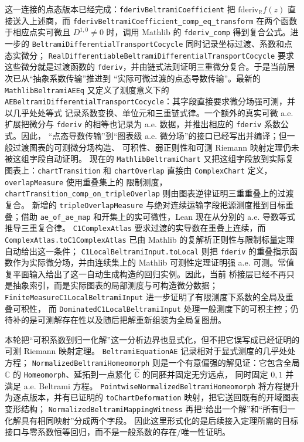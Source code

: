 \documentclass[UTF8,fontset=none,a4paper,11pt]{ctexart}
\begin{document}
这一连接的点态版本已经完成：\texttt{fderivBeltramiCoefficient} 把
\(\mathrm{fderiv}_{\mathbb R}f(z)\) 直接送入上述商，而
\texttt{fderivBeltramiCoefficient\_comp\_eq\_transform} 在两个函数于相应点实可微且
\(D^{1,0}\ne0\) 时，调用 Mathlib 的 \texttt{fderiv\_comp} 得到复合公式。进一步的
\texttt{BeltramiDifferentialTransportCocycle} 同时记录坐标过渡、系数和点态实微分；
\texttt{RealDifferentiableBeltramiDifferentialTransportCocycle} 要求这些微分就是过渡函数的
\texttt{fderiv}，并由链式法则证明三重微分复合。于是当前层次已从“抽象系数传输”推进到
“实际可微过渡的点态导数传输”。最新的 \texttt{MathlibBeltramiAEEq} 又定义了测度意义下的
\texttt{AEBeltramiDifferentialTransportCocycle}：其字段直接要求微分场强可测，并以几乎处处等式
记录系数变换、单位元和三重链式律。一个额外的真实可微 a.e. 扩展把微分与
\texttt{fderiv} 的相等也记录为 a.e. 数据，并推出相应的 \texttt{fderiv} 系数公式。因此，
“点态导数传输”到“图表级 a.e. 微分场”的接口已经写出并编译；但一般过渡图表的可测微分场构造、
可积性、弱正则性和可测 Riemann 映射定理仍未被这组字段自动证明。
现在的 \texttt{MathlibBeltramiChart} 又把这组字段放到实际复图表上：\texttt{chartTransition} 和
\texttt{chartOverlap} 直接由 \texttt{ComplexChart} 定义，\texttt{overlapMeasure} 使用重叠集上的
限制测度，\texttt{chartTransition\_comp\_on\_tripleOverlap} 则由图表逆律证明三重重叠上的过渡复合。
新增的 \texttt{tripleOverlapMeasure} 与绝对连续运输字段把源测度推到目标重叠；借助
\texttt{ae\_of\_ae\_map} 和开集上的实可微性，Lean 现在从分别的 a.e. 导数等式推导三重复合律。
\texttt{C1ComplexAtlas} 要求过渡的实导数在重叠上连续，而
\texttt{ComplexAtlas.toC1ComplexAtlas} 已由 Mathlib 的复解析正则性与限制标量定理自动给出这一条件；
\texttt{C1LocalBeltramiInput.toLocal} 则把 \texttt{fderiv} 的重叠指示函数作为实际微分场，并由连续集上的
Mathlib 可测性定理证明强 a.e. 可测。常值复平面输入给出了这一自动生成构造的回归实例。因此，当前
桥接层已经不再只是抽象索引，而是实际图表的局部测度与可构造微分数据；
\texttt{FiniteMeasureC1LocalBeltramiInput} 进一步证明了有限测度下系数的全局及重叠可积性，
而 \texttt{DominatedC1LocalBeltramiInput} 处理一般测度下的可积主控；仍待补的是可测解存在性以及随后把解重新组装为全局复图册。

本轮把“可积系数到归一化解”这一分析边界也显式化，但不把它误写成已经证明的可测 Riemann 映射定理。
\texttt{BeltramiEquationAE} 记录相对于显式测度的几乎处处方程；
\texttt{NormalizedBeltramiHomeomorph} 则是一个有意偏强的解见证：它包含全局
\(\mathbb C\) 的 \texttt{Homeomorph}、延拓到一点紧化 \(\widehat{\mathbb C}\) 的同胚并固定无穷远点，
同时固定 \(0,1\) 并满足 a.e. Beltrami 方程。
\texttt{PointwiseNormalizedBeltramiHomeomorph} 将方程提升为逐点版本，并有已证明的
\texttt{toChartDeformation} 映射，把它送回既有的开域图表变形结构；
\texttt{NormalizedBeltramiMappingWitness} 再把“给出一个解”和“所有归一化解具有相同映射”分成两个字段。
因此这里形式化的是后续接入定理所需的目标接口与零系数恒等回归，而不是一般系数的存在/唯一性证明。
\end{document}
